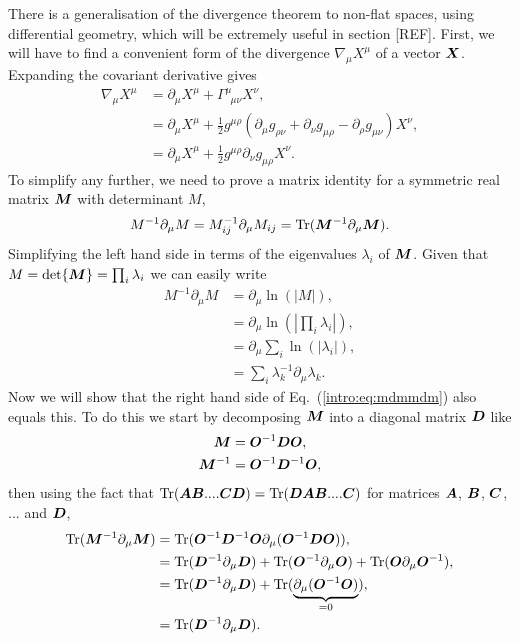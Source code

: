 There is a generalisation of the divergence theorem to non-flat spaces, using differential geometry, which will be extremely useful in section [REF]. First, we will have to find a convenient form of the divergence $\nabla_\mu X^\mu$ of a vector $\boldsymbol{X}$. Expanding the covariant derivative gives
\begin{align}
\nabla_\mu X^\mu &= \partial_\mu X^\mu + \Gamma^\mu_{\,\,\,\mu\nu}X^\nu , \\
&= \partial_\mu X^\mu + \frac{1}{2}g^{\mu\rho}\left(\partial_\mu g_{\rho\nu}+\partial_\nu g_{\mu\rho}-\partial_\rho g_{\mu\nu}\right)X^\nu , \\
&= \partial_\mu X^\mu + \frac{1}{2}g^{\mu\rho}\partial_\nu g_{\mu\rho}X^\nu. 
\end{align}
To simplify any further, we need to prove a matrix identity for a symmetric real matrix $\boldsymbol{M}$ with determinant $M$,
\begin{equation}\label{intro:eq:mdmmdm}
M^{-1} \partial_\mu M = M^{-1}_{ij} \partial_\mu M_{ij} = \mathrm{Tr}(\boldsymbol{M}^{-1} \partial_\mu \boldsymbol{M}).
\end{equation}
Simplifying the left hand side in terms of the eigenvalues $\lambda_i$ of $\boldsymbol{M}$. Given that $M=\det{\boldsymbol{M}}=\prod_i \lambda_i$ we can easily write
\begin{align}
M^{-1} \partial_\mu M &= \partial_\mu \ln(|M|) ,\\
&= \partial_\mu \ln\left(\left| \prod_i \lambda_i\right|\right) ,\\
&= \partial_\mu \sum_i \ln(\left|  \lambda_i\right|) ,\\
&= \sum_i \lambda_k^{-1}\partial_\mu \lambda_k. 
\end{align}
Now we will show that the right hand side of Eq.~(\ref{intro:eq:mdmmdm}) also equals this. To do this we start by decomposing $\boldsymbol{M}$ into a diagonal matrix $\boldsymbol{D}$ like
\begin{align}
\boldsymbol{M} &= \boldsymbol{O}^{-1} \boldsymbol{D} \boldsymbol{O},\\
\boldsymbol{M}^{-1} &= \boldsymbol{O}^{-1} \boldsymbol{D}^{-1} \boldsymbol{O},
\end{align}
then using the fact that $\mathrm{Tr}(\boldsymbol{A} \boldsymbol{B} .... \boldsymbol{C}\boldsymbol{D}) = \mathrm{Tr}(\boldsymbol{D}\boldsymbol{A} \boldsymbol{B} .... \boldsymbol{C})$ for matrices $\boldsymbol{A}$, $ \boldsymbol{B}$, $ \boldsymbol{C}$, $...$ and $\boldsymbol{D}$,
\begin{align}
\mathrm{Tr}(\boldsymbol{M}^{-1} \partial_\mu \boldsymbol{M}) &= \mathrm{Tr}(\boldsymbol{O}^{-1} \boldsymbol{D}^{-1} \boldsymbol{O} \partial_\mu (\boldsymbol{O}^{-1} \boldsymbol{D} \boldsymbol{O})) ,\\
&= \mathrm{Tr}(\boldsymbol{D}^{-1} \partial_\mu \boldsymbol{D}) + \mathrm{Tr}(\boldsymbol{O}^{-1} \partial_\mu \boldsymbol{O}) +\mathrm{Tr}(\boldsymbol{O} \partial_\mu \boldsymbol{O}^{-1}) , \\
&= \mathrm{Tr}(\boldsymbol{D}^{-1} \partial_\mu \boldsymbol{D}) + \mathrm{Tr}( \underbrace{\partial_\mu (\boldsymbol{O}^{-1}\boldsymbol{O})}_{=0}) , \\
&= \mathrm{Tr}(\boldsymbol{D}^{-1} \partial_\mu \boldsymbol{D}) .
\end{align}
